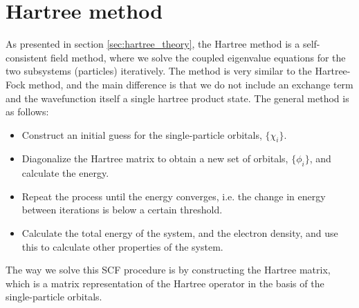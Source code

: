 \documentclass{subfiles}
\begin{document}
\section{Hartree method}\label{sec:Hartree_method}
As presented in section \ref{sec:hartree_theory}, the Hartree method is a self-consistent field method, where we solve the coupled eigenvalue equations for the two subsystems (particles) iteratively. The method is very similar to the Hartree-Fock method, and the main difference is that we do not include an exchange term and the wavefunction itself a single hartree product state. The general method is as follows:
\begin{itemize}
    \item Construct an initial guess for the single-particle orbitals, $\{\chi_i\}$.
    \item Diagonalize the Hartree matrix to obtain a new set of orbitals, $\{\phi_i\}$, and calculate the energy.
    \item Repeat the process until the energy converges, i.e. the change in energy between iterations is below a certain threshold.
    \item Calculate the total energy of the system, and the electron density, and use this to calculate other properties of the system.
\end{itemize}
The way we solve this SCF procedure is by constructing the Hartree matrix, which is a matrix representation of the Hartree operator in the basis of the single-particle orbitals. \\
\end{document}
